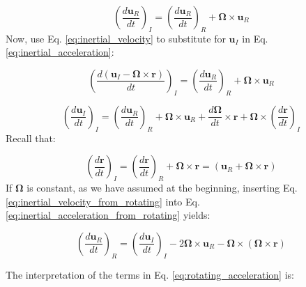 \documentclass[12pt]{article}
\numberwithin{equation}{section}
\numberwithin{figure}{section}
\numberwithin{table}{section}
\begin{document}
\begin{equation}
  \left( \frac{d\mathbf{u}_R}{dt} \right)_I = \left( \frac{d\mathbf{u}_R}{dt} \right)_R + \mathbf{\Omega} \times \mathbf{u}_R
  \label{eq:inertial_acceleration}
\end{equation}
Now, use Eq. \ref{eq:inertial_velocity} to substitute for $\mathbf{u}_I$ in
Eq. \ref{eq:inertial_acceleration}:

\begin{equation}
  \left( \frac{d\left(\mathbf{u}_I - \mathbf{\Omega} \times \mathbf{r}\right)}{dt} \right)_I = 
  \left( \frac{d\mathbf{u}_R}{dt} \right)_R + \mathbf{\Omega} \times \mathbf{u}_R
\end{equation}

\begin{equation}
  \left( \frac{d \mathbf{u}_I}{dt} \right)_I =
  \left( \frac{d \mathbf{u}_R}{dt} \right)_R +
  \mathbf{\Omega} \times \mathbf{u}_R +
  \frac{d\mathbf{\Omega}}{dt} \times \mathbf{r} +
  \mathbf{\Omega} \times \left( \frac{d\mathbf{r}}{dt} \right)_I
  \label{eq:inertial_acceleration_from_rotating}
\end{equation}
Recall that:

\begin{equation}
  \left( \frac{d \mathbf{r}}{dt} \right)_I =
  \left( \frac{d \mathbf{r}}{dt} \right)_R +
  \mathbf{\Omega} \times \mathbf{r} =
  \left( \mathbf{u}_R + \mathbf{\Omega} \times \mathbf{r} \right)
  \label{eq:inertial_velocity_from_rotating}
\end{equation}
If $\mathbf{\Omega}$ is constant, as we have assumed at the beginning,
inserting Eq. \ref{eq:inertial_velocity_from_rotating} into Eq.
\ref{eq:inertial_acceleration_from_rotating} yields:

\begin{equation}
  \left( \frac{d \mathbf{u}_R}{dt} \right)_R =
  \left( \frac{d \mathbf{u}_I}{dt} \right)_I -
  2 \mathbf{\Omega} \times \mathbf{u}_R -
  \mathbf{\Omega} \times \left( \mathbf{\Omega} \times \mathbf{r} \right)
  \label{eq:rotating_acceleration}
\end{equation}

The interpretation of the terms in Eq. \ref{eq:rotating_acceleration} is:
\end{document}
